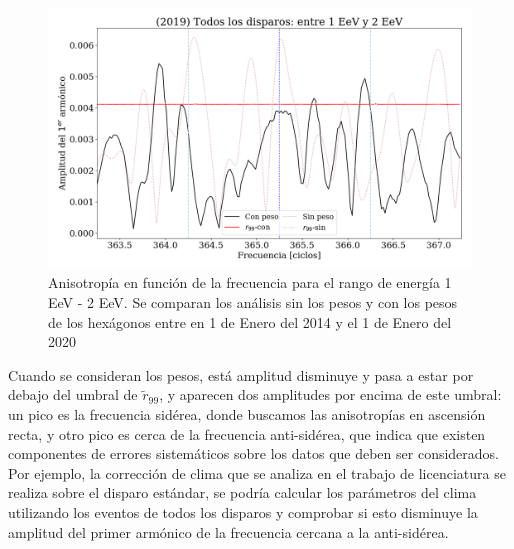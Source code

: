 		\begin{figure}[H]
			\centering
			\includegraphics[width=0.85\linewidth]{pesos_sin_con_1_2_EeV.png}
			\caption{Anisotropía en función de la frecuencia para el rango de energía 1  EeV - 2 EeV. Se comparan los análisis sin los pesos y con los pesos de los hexágonos entre en 1 de Enero del 2014 y el 1 de Enero del 2020}
			\label{anisotropia_rayleigh}
		\end{figure}

Cuando se consideran los pesos, está amplitud disminuye y pasa a estar por debajo del umbral de $\tilde{r}_{99}$, y aparecen dos amplitudes por encima de este umbral: un pico es la frecuencia sidérea, donde buscamos las anisotropías en ascensión recta, y otro pico es cerca de la frecuencia anti-sidérea, que indica que existen componentes de errores sistemáticos sobre los datos que deben ser considerados. Por ejemplo, la corrección de clima que se analiza en el trabajo de licenciatura se realiza sobre el disparo estándar, se podría calcular los parámetros del clima utilizando los eventos de todos los disparos y comprobar si esto disminuye la amplitud del primer armónico de la frecuencia cercana a la anti-sidérea.

